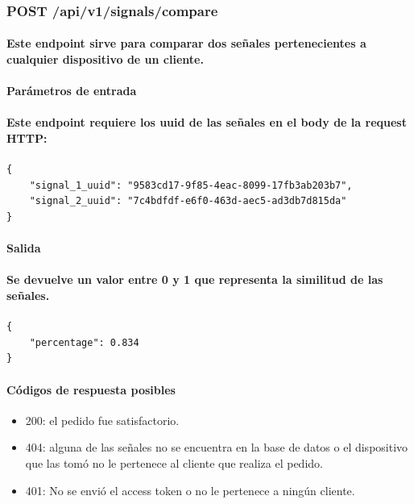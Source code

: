 \documentclass{article}
\begin{document}
\subsubsection{POST /api/v1/signals/compare}
\paragraph{
Este endpoint sirve para comparar dos señales pertenecientes a cualquier dispositivo de un cliente.
}

\paragraph{
\textbf{Parámetros de entrada}
}

\paragraph{
Este endpoint requiere los uuid de las señales en el body de la request HTTP:
}

\begin{verbatim}
{
    "signal_1_uuid": "9583cd17-9f85-4eac-8099-17fb3ab203b7",
    "signal_2_uuid": "7c4bdfdf-e6f0-463d-aec5-ad3db7d815da"
}

\end{verbatim}

\paragraph{
\textbf{Salida}
}

\paragraph{
Se devuelve un valor entre 0 y 1 que representa la similitud de las señales.
}

\begin{verbatim}
{
    "percentage": 0.834
}
\end{verbatim}

\paragraph{
Códigos de respuesta posibles
}
\begin{itemize}
    \item 200: el pedido fue satisfactorio.
    \item 404: alguna de las señales no se encuentra en la base de datos o el dispositivo que las tomó no le pertenece al cliente que realiza el pedido.
    \item 401: No se envió el access token o no le pertenece a ningún cliente.
\end{itemize}
\end{document}
